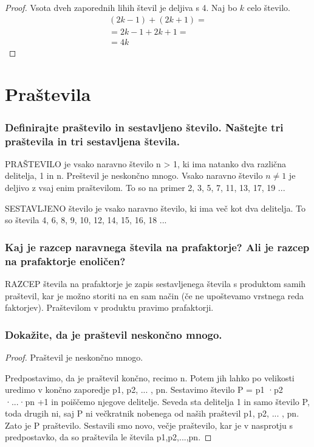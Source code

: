 \documentclass{article}
\begin{document}
\begin{proof}
Vsota dveh zaporednih lihih števil je deljiva s 4.
Naj bo $k$ celo število. 
\begin{gather*}
    (2k - 1) + (2k + 1) = \\
    = 2k -1 + 2k +1 = \\
    = 4k
\end{gather*}
\end{proof}

\section{Praštevila}
\subsubsection*{Definirajte praštevilo in sestavljeno število. Naštejte tri praštevila in tri sestavljena števila.}
PRAŠTEVILO je vsako naravno število n > 1, ki ima natanko dva različna delitelja, 1 in n. Preštevil je neskončno mnogo. Vsako naravno število $n \neq 1$ je deljivo z vsaj enim praštevilom. To so na primer 2, 3, 5, 7, 11, 13, 17, 19 ...

SESTAVLJENO število je vsako naravno število, ki ima več kot dva delitelja.
To so števila 4, 6, 8, 9, 10, 12, 14, 15, 16, 18 ...

\subsubsection*{Kaj je razcep naravnega števila na prafaktorje? Ali je razcep na prafaktorje enoličen?}
RAZCEP števila na prafaktorje je zapis sestavljenega števila s produktom samih praštevil, kar je možno storiti na en sam način (če ne upoštevamo vrstnega reda faktorjev). Praštevilom v produktu pravimo prafaktorji.

\subsubsection*{Dokažite, da je praštevil neskončno mnogo.}
\begin{proof}
     Praštevil je neskončno mnogo.

Predpostavimo, da je praštevil končno, recimo n. Potem jih lahko po velikosti uredimo v končno zaporedje p1, p2, ... , pn. Sestavimo število P = p1 ·p2 ·...·pn +1 in poiščemo njegove delitelje. Seveda sta delitelja 1 in samo število P, toda drugih ni, saj P ni večkratnik nobenega od naših praštevil p1, p2, ... , pn. Zato je P praštevilo. Sestavili smo novo, večje praštevilo, kar je v nasprotju s predpostavko, da so praštevila le števila p1,p2,...,pn.

\end{proof}
\end{document}
